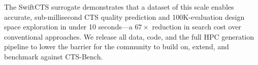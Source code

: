 \documentclass[acmsmall,review,anonymous]{acmart}
\begin{document}
The SwiftCTS surrogate demonstrates that a dataset of this scale enables
accurate, sub-millisecond CTS quality prediction and 100K-evaluation design
space exploration in under 10 seconds---a $67\times$ reduction in search cost
over conventional approaches.
We release all data, code, and the full HPC generation pipeline to lower the
barrier for the community to build on, extend, and benchmark against
CTS-Bench.



\end{document}
